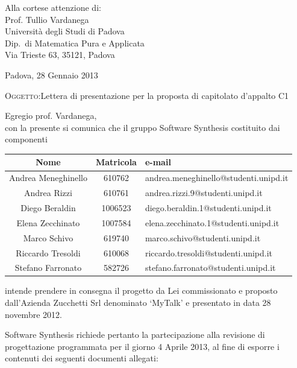\documentclass[a4paper,10pt]{letter}
\begin{document}
\begin{flushright}
\begin{minipage}[t]{.5\textwidth}
Alla cortese attenzione di:\\
Prof. Tullio Vardanega\\
Università degli Studi di Padova\\
Dip.~di Matematica Pura e Applicata\\
Via Trieste 63, 35121, Padova\\
\end{minipage}
\end{flushright}

Padova, 28 Gennaio 2013

\textsc{Oggetto:}Lettera di presentazione per la proposta di capitolato d’appalto C1

\noindent{}Egregio prof. Vardanega,\\
\hspace*{11em} con la presente si comunica che il gruppo Software Synthesis costituito dai componenti

\begin{center}
\begin{tabular} {c|c|l}
{\bf Nome}&{\bf Matricola}&{\bf e-mail}\\ 
\hline
Andrea Meneghinello & 610762& andrea.meneghinello@studenti.unipd.it\\
Andrea Rizzi & 610761&andrea.rizzi.9@studenti.unipd.it\\
Diego Beraldin& 1006523& diego.beraldin.1@studenti.unipd.it\\
Elena Zecchinato&1007584&elena.zecchinato.1@studenti.unipd.it\\
Marco Schivo &619740& marco.schivo@studenti.unipd.it\\
Riccardo Tresoldi &610068 &riccardo.tresoldi@studenti.unipd.it\\
Stefano Farronato &582726&stefano.farronato@studenti.unipd.it\\
\end{tabular}
\end{center}

intende prendere in consegna il progetto da Lei commissionato e proposto dall'Azienda Zucchetti Srl denominato `MyTalk' e presentato in data 28 novembre 2012.

Software Synthesis richiede pertanto la partecipazione alla revisione di progettazione programmata per il giorno 4 Aprile 2013, al fine di esporre i contenuti dei seguenti documenti allegati:
\end{document}
